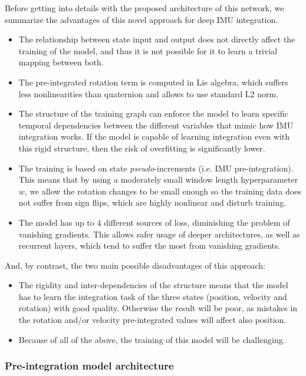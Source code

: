 Before getting into details with the proposed architecture of this network, we summarize the advantages of this novel approach for deep IMU integration.
\begin{itemize}
    \item The relationship between state input and output does not directly affect the training of the model, and thus it is not possible for it to learn a trivial mapping between both.
    \item The pre-integrated rotation term is computed in Lie algebra, which suffers less nonlinearities than quaternion and allows to use standard L2 norm.
    \item The structure of the training graph can enforce the model to learn specific temporal dependencies between the different variables that mimic how IMU integration works.
    If the model is capable of learning integration even with this rigid structure, then the risk of overfitting is significantly lower.
    \item The training is based on state \emph{pseudo}-increments (i.e. IMU pre-integration). 
    This means that by using a moderately small window length hyperparameter $w$, we allow the rotation changes to be small enough so the training data does not suffer from sign flips, which are highly nonlinear and disturb training.
    \item The model has up to 4 different sources of loss, diminishing the problem of vanishing gradients.
    This allows safer usage of deeper architectures, as well as recurrent layers, which tend to suffer the most from vanishing gradients.
\end{itemize}
And, by contrast, the two main possible disadvantages of this approach:
\begin{itemize}
    \item The rigidity and inter-dependencies of the structure means that the model has to learn the integration task of the three states (position, velocity and rotation) with good quality. 
    Otherwise the result will be poor, as mistakes in the rotation and/or velocity pre-integrated values will affect also position.
    \item Because of all of the above, the training of this model will be challenging.
    
\end{itemize}

\subsubsection{Pre-integration model architecture}

